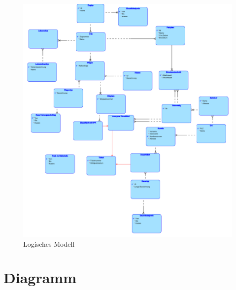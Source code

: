 \begin{figure}[h]
    \caption{Logisches Modell}
    \centering
    \includegraphics[width=1\textwidth]{logical}
    \end{figure}
\section{Diagramm}
\label{section:Diagramm}
